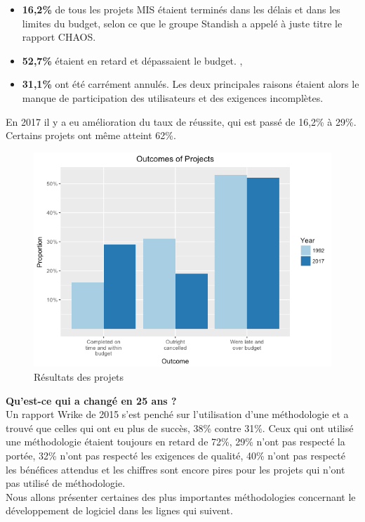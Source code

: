 \documentclass[a4paper, 12pt]{report}
\begin{document}
\begin{itemize}
  \item \textbf{16,2\%} de tous les projets MIS étaient terminés dans les délais et dans les limites du budget, selon ce que le groupe Standish a appelé à juste titre le rapport CHAOS.  
  \item \textbf{52,7\%} étaient en retard et dépassaient le budget. ,
  \item \textbf{31,1\%} ont été carrément annulés. Les deux principales raisons étaient alors le manque de participation des utilisateurs et des exigences incomplètes. 
\end{itemize} 

En 2017 il y a eu amélioration du taux de réussite, qui est passé de 16,2\% à 29\%. Certains projets ont même atteint 62\%.  

\begin{figure}[!h]
\centering
\includegraphics[width = 1\linewidth]{img/outcome-of-projects.png}
\caption{Résultats des projets}
\end{figure}\cite{speedandfunction}

\textbf{Qu’est-ce qui a changé en 25 ans ?} \\
Un rapport Wrike de 2015 s'est penché sur l'utilisation d'une méthodologie et a trouvé que celles qui ont eu plus de succès, 38\% contre 31\%.  Ceux qui ont utilisé une méthodologie étaient toujours en retard de 72\%, 29\% n'ont pas respecté la portée, 32\% n'ont pas respecté les exigences de qualité, 40\% n'ont pas respecté les bénéfices attendus et les chiffres sont encore pires pour les projets qui n'ont pas utilisé de méthodologie.\\
Nous allons présenter certaines des plus importantes méthodologies concernant le développement de logiciel dans les lignes qui suivent. 
\end{document}
